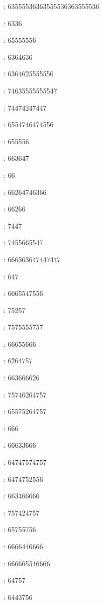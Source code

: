 : 63555536363555536363555536\par
{}: 6336\par
{}: 65555556\par
{}: 6364636\par
{}: 6364625555556\par
{}: 74635555555547\par
{}: 74474247447\par
{}: 6554746474556\par
{}: 655556\par
{}: 663647\par
{}: 66\par
{}: 66264746366\par
{}: 66266\par
{}: 7447\par
{}: 7455665547\par
{}: 666363647447447\par
{}: 647\par
{}: 6665547556\par
{}: 75257\par
{}: 7575555757\par
{}: 66655666\par
{}: 6264757\par
{}: 663666626\par
{}: 75746264757\par
{}: 65575264757\par
{}: 666\par
{}: 66633666\par
{}: 64747574757\par
{}: 6474752556\par
{}: 663466666\par
{}: 757424757\par
{}: 65755756\par
{}: 6666446666\par
{}: 666665546666\par
{}: 64757\par
{}: 6443756\par

